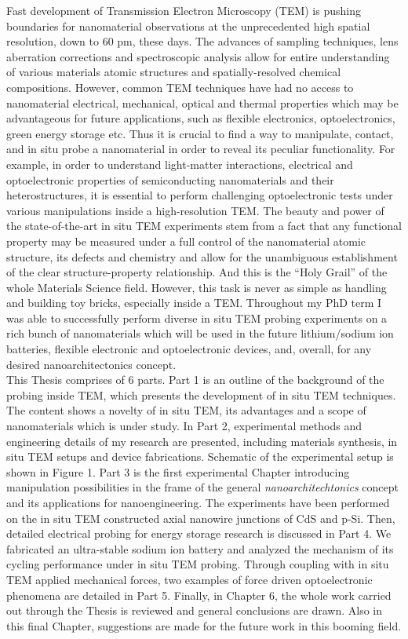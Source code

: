 \justify

Fast development of Transmission Electron Microscopy (TEM) is pushing boundaries for nanomaterial observations at the unprecedented high spatial resolution, down to 60 pm, these days. The advances of sampling techniques, lens aberration corrections and spectroscopic analysis allow for entire understanding of various materials atomic structures and spatially-resolved chemical compositions. However, common TEM techniques have had no access to nanomaterial electrical, mechanical, optical and thermal properties which may be advantageous for future applications, such as flexible electronics, optoelectronics, green energy storage etc. Thus it is crucial to find a way to manipulate, contact, and in situ probe a nanomaterial in order to reveal its peculiar functionality. For example, in order to understand light-matter interactions, electrical and optoelectronic properties of semiconducting nanomaterials and their heterostructures, it is essential to perform challenging optoelectronic tests under various manipulations inside a high-resolution TEM. The beauty and power of the state-of-the-art in situ TEM experiments stem from a fact that any functional property may be measured under a full control of the nanomaterial atomic structure, its defects and chemistry and allow for the unambiguous establishment of the clear structure-property relationship. And this is the “Holy Grail” of the whole Materials Science field. However, this task is never as simple as handling and building toy bricks, especially inside a TEM. Throughout my PhD term I was able to successfully perform diverse in situ TEM probing experiments on a rich bunch of nanomaterials which will be used in the future lithium/sodium ion batteries, flexible electronic and optoelectronic devices, and, overall, for any desired nanoarchitectonics concept. \\
This Thesis comprises of 6 parts. Part 1 is an outline of the background of the probing inside TEM, which presents the development of in situ TEM techniques. The content shows a novelty of in situ TEM, its advantages and a scope of nanomaterials which is under study. In Part 2, experimental methods and engineering details of my research are presented, including materials synthesis, in situ TEM setups and device fabrications. Schematic of the experimental setup is shown in Figure 1. Part 3 is the first experimental Chapter introducing manipulation possibilities in the frame of the general {\em nanoarchitechtonics} concept and its applications for nanoengineering. The experiments have been performed on the in situ TEM constructed axial nanowire junctions of CdS and p-Si. Then, detailed electrical probing for energy storage research is discussed in Part 4. We fabricated an ultra-stable sodium ion battery and analyzed the mechanism of its cycling performance under in situ TEM probing. Through coupling with in situ TEM applied mechanical forces, two examples of force driven optoelectronic phenomena are detailed in Part 5. Finally, in Chapter 6, the whole work carried out through the Thesis is reviewed and general conclusions are drawn. Also in this final Chapter, suggestions are made for the future work in this booming field. 
